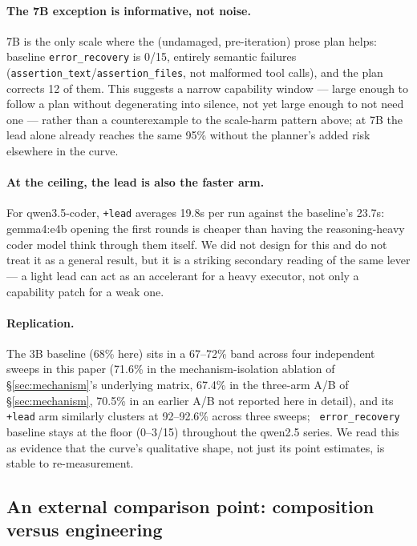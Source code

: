 \documentclass[smallcondensed,natbib]{svjour3}
\begin{document}
\paragraph{The 7B exception is informative, not noise.} 7B is the only
scale where the (undamaged, pre-iteration) prose plan helps: baseline
\texttt{error\_recovery} is 0/15, entirely semantic failures
(\texttt{assertion\_text}/\texttt{assertion\_files}, not malformed tool
calls), and the plan corrects 12 of them. This suggests a narrow
capability window --- large enough to follow a plan without degenerating
into silence, not yet large enough to not need one --- rather than a
counterexample to the scale-harm pattern above; at 7B the lead alone
already reaches the same 95\% without the planner's added risk
elsewhere in the curve.

\paragraph{At the ceiling, the lead is also the faster arm.} For
qwen3.5-coder, \texttt{+lead} averages 19.8s per run against the
baseline's 23.7s: gemma4:e4b opening the first rounds is cheaper than
having the reasoning-heavy coder model think through them itself. We did
not design for this and do not treat it as a general result, but it is
a striking secondary reading of the same lever --- a light lead can act
as an accelerant for a heavy executor, not only a capability patch for a
weak one.

\paragraph{Replication.} The 3B baseline (68\% here) sits in a
67--72\% band across four independent sweeps in this paper (71.6\% in
the mechanism-isolation ablation of \S\ref{sec:mechanism}'s underlying
matrix, 67.4\% in the three-arm A/B of \S\ref{sec:mechanism}, 70.5\% in
an earlier A/B not reported here in detail), and its \texttt{+lead} arm
similarly clusters at 92--92.6\% across three sweeps; \texttt{
error\_recovery} baseline stays at the floor (0--3/15) throughout the
qwen2.5 series. We read this as evidence that the curve's qualitative
shape, not just its point estimates, is stable to re-measurement.

\subsection{An external comparison point: composition versus
engineering}\label{sec:external}
\end{document}
